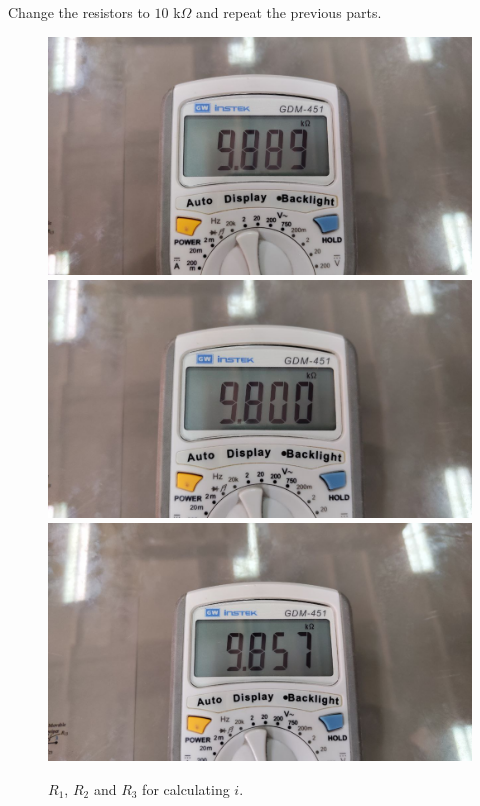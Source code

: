 \documentclass[11pt]{article}
\begin{document}
\begin{question}
\begin{subquestion}{Change the resistors to $10$ k$\Omega$ and repeat the previous parts. }
{            \begin{figure}[H]
                \centering
                \includegraphics[scale=0.08,angle=0]{Fig/10.jpeg}
                \includegraphics[scale=0.08,angle=0]{Fig/11.jpeg}
                \includegraphics[scale=0.08,angle=0]{Fig/12.jpeg}
                \caption{$R_1$, $R_2$ and $R_3$ for calculating $i$.}
            \end{figure}

}
\end{subquestion}
\end{question}
\end{document}

